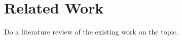 
\section{Related Work}
\label{sec:related}
Do a literature review of the existing work on the topic.